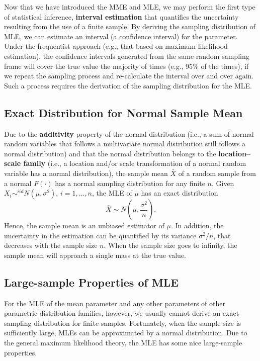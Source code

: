\documentclass[]{book}
\theoremstyle{definition}
\theoremstyle{definition}
\theoremstyle{definition}
\theoremstyle{remark}
\begin{document}
Now that we have introduced the MME and MLE, we may perform the first
type of statistical inference, \textbf{interval estimation} that
quantifies the uncertainty resulting from the use of a finite sample. By
deriving the sampling distribution of MLE, we can estimate an interval
(a confidence interval) for the parameter. Under the frequentist
approach (e.g., that based on maximum likelihood estimation), the
confidence intervals generated from the same random sampling frame will
cover the true value the majority of times (e.g., 95\% of the times), if
we repeat the sampling process and re-calculate the interval over and
over again. Such a process requires the derivation of the sampling
distribution for the MLE.

\subsection{Exact Distribution for Normal Sample
Mean}\label{S:AppA:IE:ED}

Due to the \textbf{additivity} property of the normal distribution
(i.e., a sum of normal random variables that follows a multivariate
normal distribution still follows a normal distribution) and that the
normal distribution belongs to the \textbf{location--scale family}
(i.e., a location and/or scale transformation of a normal random
variable has a normal distribution), the sample mean \(\bar{X}\) of a
random sample from a normal \(F(\cdot)\) has a normal sampling
distribution for any finite \(n\). Given
\(X_i\sim^{iid} N(\mu,\sigma^2)\), \(i=1,\dots,n\), the MLE of \(\mu\)
has an exact distribution
\[\bar{X}\sim N\left(\mu,\frac{\sigma^2}{n}\right).\] Hence, the sample
mean is an unbiased estimator of \(\mu\). In addition, the uncertainty
in the estimation can be quantified by its variance \(\sigma^2/n\), that
decreases with the sample size \(n\). When the sample size goes to
infinity, the sample mean will approach a single mass at the true value.

\subsection{Large-sample Properties of
MLE}\label{large-sample-properties-of-mle}

For the MLE of the mean parameter and any other parameters of other
parametric distribution families, however, we usually cannot derive an
exact sampling distribution for finite samples. Fortunately, when the
sample size is sufficiently large, MLEs can be approximated by a normal
distribution. Due to the general maximum likelihood theory, the MLE has
some nice large-sample properties.
\end{document}
